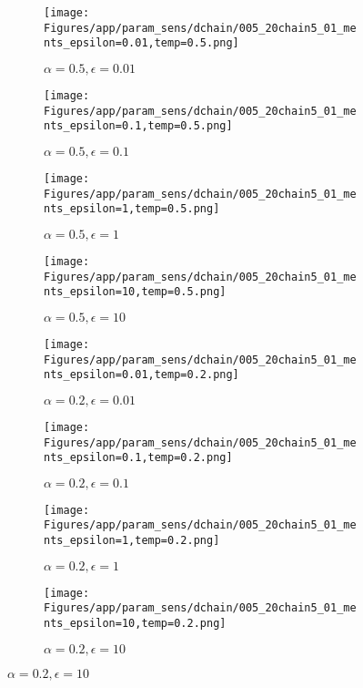 \documentclass{article}
\theoremstyle{plain}
\begin{document}
\begin{appendices}
\begin{figure}
                \begin{subfigure}[b]{0.24\textwidth}
                    \centering
                    \texttt{[image: Figures/app/param\_sens/dchain/005\_20chain5\_01\_ments\_epsilon=0.01,temp=0.5.png]}
                    \caption*{$\alpha=0.5,\epsilon=0.01$}
                \end{subfigure}
                \begin{subfigure}[b]{0.24\textwidth}
                    \centering
                    \texttt{[image: Figures/app/param\_sens/dchain/005\_20chain5\_01\_ments\_epsilon=0.1,temp=0.5.png]}
                    \caption*{$\alpha=0.5,\epsilon=0.1$}
                \end{subfigure}
                \begin{subfigure}[b]{0.24\textwidth}
                    \centering
                    \texttt{[image: Figures/app/param\_sens/dchain/005\_20chain5\_01\_ments\_epsilon=1,temp=0.5.png]}
                    \caption*{$\alpha=0.5,\epsilon=1$}
                \end{subfigure}
                \begin{subfigure}[b]{0.24\textwidth}
                    \centering
                    \texttt{[image: Figures/app/param\_sens/dchain/005\_20chain5\_01\_ments\_epsilon=10,temp=0.5.png]}
                    \caption*{$\alpha=0.5,\epsilon=10$}
                \end{subfigure}
                
                \begin{subfigure}[b]{0.24\textwidth}
                    \centering
                    \texttt{[image: Figures/app/param\_sens/dchain/005\_20chain5\_01\_ments\_epsilon=0.01,temp=0.2.png]}
                    \caption*{$\alpha=0.2,\epsilon=0.01$}
                \end{subfigure}
                \begin{subfigure}[b]{0.24\textwidth}
                    \centering
                    \texttt{[image: Figures/app/param\_sens/dchain/005\_20chain5\_01\_ments\_epsilon=0.1,temp=0.2.png]}
                    \caption*{$\alpha=0.2,\epsilon=0.1$}
                \end{subfigure}
                \begin{subfigure}[b]{0.24\textwidth}
                    \centering
                    \texttt{[image: Figures/app/param\_sens/dchain/005\_20chain5\_01\_ments\_epsilon=1,temp=0.2.png]}
                    \caption*{$\alpha=0.2,\epsilon=1$}
                \end{subfigure}
                \begin{subfigure}[b]{0.24\textwidth}
                    \centering
                    \texttt{[image: Figures/app/param\_sens/dchain/005\_20chain5\_01\_ments\_epsilon=10,temp=0.2.png]}
                    \caption*{$\alpha=0.2,\epsilon=10$}
                \end{subfigure}
                

\end{figure}
\end{appendices}
\end{document}
